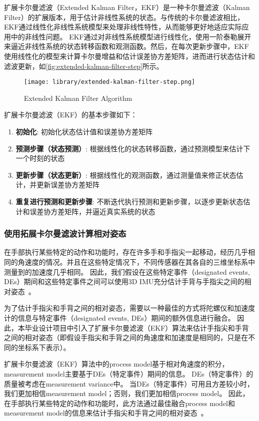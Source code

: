 扩展卡尔曼滤波（Extended Kalman Filter，EKF）是一种卡尔曼滤波（Kalman Filter）的扩展版本，用于估计非线性系统的状态。与传统的卡尔曼滤波相比，EKF通过线性化非线性系统模型来处理非线性特性，从而能够更好地适应实际应用中的非线性问题。
EKF通过对非线性系统模型进行线性化，使用一阶泰勒展开来逼近非线性系统的状态转移函数和观测函数。然后，在每次更新步骤中，EKF使用线性化的模型来计算卡尔曼增益和估计误差协方差矩阵，进而进行状态估计和滤波更新，如\autoref{fig:extended-kalman-filter-step}所示。

\begin{figure}[H]
    \centering
    \texttt{[image: library/extended-kalman-filter-step.png]}
    \caption{\label{fig:extended-kalman-filter-step}Extended Kalman Filter Algorithm}
\end{figure}

扩展卡尔曼滤波（EKF）的基本步骤如下：
\begin{enumerate}
    \item {\bfseries 初始化}: 初始化状态估计值和误差协方差矩阵
    \item {\bfseries 预测步骤（状态预测）}: 根据线性化的状态转移函数，通过预测模型来估计下一个时刻的状态
    \item {\bfseries 更新步骤（状态更新）}: 根据线性化的观测函数，通过测量值来修正状态估计，并更新误差协方差矩阵
    \item {\bfseries 重复进行预测和更新步骤}: 不断迭代执行预测和更新步骤，以逐步更新状态估计和误差协方差矩阵，并逼近真实系统的状态
\end{enumerate}

\subsubsection{使用拓展卡尔曼滤波计算相对姿态}
在手部执行某些特定的动作和功能时，存在许多手和手指尖一起移动，经历几乎相同的角速度的情况。并且在这些特定情况下，不同传感器在其各自的三维坐标系中测量到的加速度几乎相同。
因此，我们假设在这些特定事件（designated events, DEs）期间和这些特定事件之间可以使用3D IMU充分估计手背与手指尖之间的相对姿态~\cite{mainArticle1}。

为了估计手指尖和手背之间的相对姿态，需要以一种最佳的方式将陀螺仪和加速度计的信息与特定事件（designated events, DEs）期间的额外信息进行融合。
因此，本毕业设计项目中引入了扩展卡尔曼滤波（EKF）算法来估计手指尖和手背之间的相对姿态（即假设手指尖和手背之间的角速度和加速度是相同的，只是在不同的坐标系下表示）。

扩展卡尔曼滤波（EKF）算法中的process model基于相对角速度的积分，measurement model主要基于DEs（特定事件）期间的信息。
DEs（特定事件）的质量被考虑在measurement variance中。
当DEs（特定事件）可用且方差较小时，我们更加相信measurement model；否则，我们更加相信process model。
因此，在手部执行某些特定的动作和功能时，此方法通过最佳融合process model和measurement model的信息来估计手指尖和手背之间的相对姿态~\cite{mainArticle1}。

